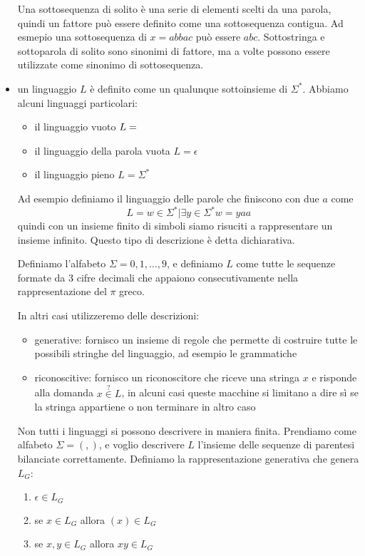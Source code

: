 \documentclass[12pt]{article}
\begin{document}
\begin{itemize}
		Una sottosequenza di solito è una serie di elementi scelti da una parola, quindi un fattore può essere definito come una sottosequenza contigua. 
		Ad esmepio una sottosequenza di $x = abbac$ può essere $abc$.
		Sottostringa e sottoparola di solito sono sinonimi di fattore, ma a volte possono essere utilizzate come sinonimo di sottosequenza.
	\item un linguaggio $L$ è definito come un qualunque sottoinsieme di $\Sigma^*$.
		Abbiamo alcuni linguaggi particolari:
		\begin{itemize}
			\item il linguaggio vuoto $L = \empty$
			\item il linguaggio della parola vuota $L = { \epsilon }$
			\item il linguaggio pieno $L = \Sigma^*$
		\end{itemize}
		Ad esempio definiamo il linguaggio delle parole che finiscono con due $a$ come
		$$ L = { w \in \Sigma^* | \exists y \in \Sigma^* w = yaa } $$
		quindi con un insieme finito di simboli siamo risuciti a rappresentare un insieme infinito.
		Questo tipo di descrizione è detta dichiarativa.

		Definiamo l'alfabeto $\Sigma = { 0, 1, \dots, 9 }$, e definiamo $L$ come tutte le sequenze formate da 3 cifre decimali che appaiono consecutivamente nella rappresentazione del $\pi$ greco.

		In altri casi utilizzeremo delle descrizioni:
		\begin{itemize}
			\item generative: fornisco un insieme di regole che permette di costruire tutte le possibili stringhe del linguaggio, ad esempio le grammatiche
			\item riconoscitive: fornisco un riconoscitore che riceve una stringa $x$ e risponde alla domanda $x \overset{?}{\in} L$, in alcuni casi queste macchine si limitano a dire sì se la stringa appartiene o non terminare in altro caso
		\end{itemize}

		Non tutti i linguaggi si possono descrivere in maniera finita.
		Prendiamo come alfabeto $\Sigma = { (, ) }$, e voglio descrivere $L$ l'insieme delle sequenze di parentesi bilanciate correttamente.
		Definiamo la rappresentazione generativa che genera $L_G$:
		\begin{enumerate}
			\item $\epsilon \in L_G$
			\item se $x \in L_G$ allora $(x) \in L_G$
			\item se $x, y \in L_G$ allora $xy \in L_G$
		\end{enumerate}


\end{itemize}
\end{document}
